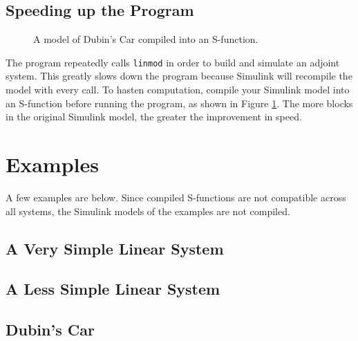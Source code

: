 \documentclass{article}
\begin{document}
\subsection{Speeding up the Program}

\begin{figure}
\begin{center}
\caption{A model of Dubin's Car compiled into an S-function.}
\end{center}
\label{sfunc}
\end{figure}

The program repeatedly calls \texttt{linmod} in order to build and simulate an
adjoint system. This greatly slows down the program because Simulink will
recompile the model with every call. To hasten computation, compile your
Simulink model into an S-function before running the program, as shown in Figure
\ref{sfunc}. The more blocks in the original Simulink model, the greater the
improvement in speed.


\section{Examples}
A few examples are below. Since compiled S-functions are not compatible across
all systems, the Simulink models of the examples are not compiled.

\subsection{A Very Simple Linear System}
\subsection{A Less Simple Linear System}
\subsection{Dubin's Car}
\end{document}

